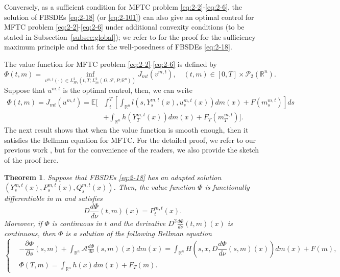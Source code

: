 \documentclass[11pt]{article}
\numberwithin{equation}{section}
\newtheorem{theorem}{Theorem}[section]
\newcommand{\e}{\mathbb{E}}
\newcommand{\pr}{\mathcal{P}}
\newcommand{\brn}{{\mathbb{R}^n}}
\newcommand{\1}{\mbox{1\hspace{-1mm}I}}
\begin{document}
Conversely, as a sufficient condition for MFTC problem \eqref{eq:2-2}-\eqref{eq:2-6}, the solution of FBSDEs \eqref{eq:2-18} (or \eqref{eq:2-101}) can also give an optimal control for MFTC problem \eqref{eq:2-2}-\eqref{eq:2-6} under additional convexity conditions (to be stated in Subsection~\ref{subsec:global}); we refer to \cite{AB8} for the proof for the sufficiency maximum principle and that for the well-posedness of FBSDEs \eqref{eq:2-18}. 


The value function for MFTC problem \eqref{eq:2-2}-\eqref{eq:2-6} is defined by 
\begin{equation}
    \Phi(t,m)=\inf_{v^{m,t}_\cdot(\cdot) \in L_{\mathcal{W}_{t}}^{2}\left(t,T;L_{m}^{2}(\Omega,\mathcal{F},P;\brn)\right)}J_{mt}\left(v^{m,t}\right),\quad (t,m)\in[0,T]\times\pr_2(\brn). 
\end{equation}
Suppose that $u^{m,t}$ is the optimal control, then, we can write
\begin{align*}
    \Phi(t,m)=J_{mt}\left(u^{m,t}\right)=\e\bigg[&\int_t^T \left[\int_{\brn}l\left(s,Y^{m,t}_s(x),u^{m,t}_s(x)\right)dm(x)+F\left(m^{m,t}_s\right)\right] ds\\
    &+\int_{\brn}h\left(Y^{m,t}_T(x)\right)dm(x)+F_{T}\left(m^{m,t}_T\right)\bigg]. 
\end{align*}
The next result shows that when the value function is smooth enough, then it satisfies the Bellman equation for MFTC. For the detailed proof, we refer to our previous work \cite{AB8}, but for the convenience of the readers, we also provide the sketch of the proof here. 

\begin{theorem}\label{thm:Bellman}
Suppose that FBSDEs \eqref{eq:2-18} has an adapted solution $\left(Y^{m,t}_s(x),P^{m,t}_s(x),Q^{m,t}_s(x)\right)$. Then, the value function $\Phi$ is functionally differentiable in $m$ and satisfies
\begin{equation}\label{eq:2-26}
    D\dfrac{d\Phi}{d\nu}(t,m)(x)=P^{m,t}_t(x).
\end{equation}
Moreover, if $\Phi$ is continuous in $t$ and the derivative $D^2\frac{d\Phi}{d\nu}(t,m)(x)$ is continuous, then $\Phi$ is a solution of the following Bellman equation 
\begin{equation}\label{eq:2-21}
    \left\{
        \begin{aligned}
            &-\dfrac{\partial \Phi}{\partial s}(s,m)+\int_{\brn}\mathcal{A}\frac{d\Phi}{d\nu}(s,m)(x)dm(x)=\int_{\brn}H\left(s,x,D\dfrac{d\Phi}{d\nu}(s,m)(x)\right)dm(x)+F(m),\\
            &\Phi(T,m)=\int_{\brn}h(x)dm(x)+F_{T}(m).
        \end{aligned}
    \right.
\end{equation} 
\end{theorem}
\end{document}

